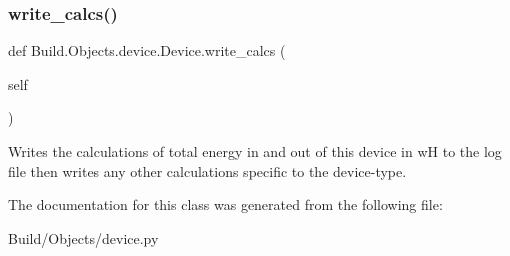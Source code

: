 \subsubsection{\texorpdfstring{write\+\_\+calcs()}{write\_calcs()}}
{\footnotesize\ttfamily def Build.\+Objects.\+device.\+Device.\+write\+\_\+calcs (\begin{DoxyParamCaption}\item[{}]{self }\end{DoxyParamCaption})}



Writes the calculations of total energy in and out of this device in wH to the log file then writes any other calculations specific to the device-\/type. 



The documentation for this class was generated from the following file\+:\begin{DoxyCompactItemize}
\item 
Build/\+Objects/device.\+py\end{DoxyCompactItemize}
